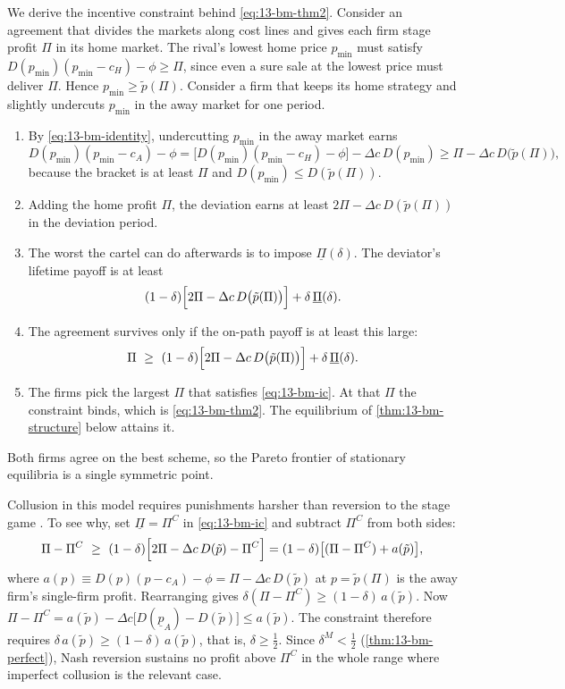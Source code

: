We derive the incentive constraint behind \eqref{eq:13-bm-thm2}. Consider an agreement that divides the
markets along cost lines and gives each firm stage profit $\Pi$ in its home market. The rival's lowest home
price $p_{\min}$ must satisfy $D(p_{\min})(p_{\min}-c_H)-\phi\ge\Pi$, since even a sure sale at the lowest price
must deliver $\Pi$. Hence $p_{\min}\ge\tilde p(\Pi)$. Consider a firm that keeps its home strategy and
slightly undercuts $p_{\min}$ in the away market for one period.
\begin{enumerate}[label=Step \arabic*.,leftmargin=*]
\item By \eqref{eq:13-bm-identity}, undercutting $p_{\min}$ in the away market earns
\[
D(p_{\min})(p_{\min}-c_A)-\phi=\bigl[D(p_{\min})(p_{\min}-c_H)-\phi\bigr]-\Delta c\,D(p_{\min})
\ge\Pi-\Delta c\,D\bigl(\tilde p(\Pi)\bigr),
\]
because the bracket is at least $\Pi$ and $D(p_{\min})\le D(\tilde p(\Pi))$.
\item Adding the home profit $\Pi$, the deviation earns at least $2\Pi-\Delta c\,D(\tilde p(\Pi))$ in the
deviation period.
\item The worst the cartel can do afterwards is to impose $\underline\Pi(\delta)$. The deviator's lifetime payoff
is at least
\[
(1-\delta)\Bigl[2\Pi-\Delta c\,D\bigl(\tilde p(\Pi)\bigr)\Bigr]+\delta\,\underline\Pi(\delta).
\]
\item The agreement survives only if the on-path payoff is at least this large:
\begin{equation}\label{eq:13-bm-ic}
\Pi\ \ge\ (1-\delta)\Bigl[2\Pi-\Delta c\,D\bigl(\tilde p(\Pi)\bigr)\Bigr]+\delta\,\underline\Pi(\delta).
\end{equation}
\item The firms pick the largest $\Pi$ that satisfies \eqref{eq:13-bm-ic}. At that $\Pi$ the constraint
binds, which is \eqref{eq:13-bm-thm2}. The equilibrium of \cref{thm:13-bm-structure} below attains it.
\end{enumerate}
Both firms agree on the best scheme, so the Pareto frontier of stationary equilibria is a single symmetric
point.

\begin{remark}\label{rem:13-bm-nash}
Collusion in this model requires punishments harsher than reversion to the stage game
\citep[footnote 22]{BernheimMadsen2017}. To see why, set $\underline\Pi=\Pi^C$ in \eqref{eq:13-bm-ic} and
subtract $\Pi^C$ from both sides:
\[
\Pi-\Pi^C\ \ge\ (1-\delta)\Bigl[2\Pi-\Delta c\,D(\tilde p)-\Pi^C\Bigr]
=(1-\delta)\bigl[(\Pi-\Pi^C)+a(\tilde p)\bigr],
\]
where $a(p)\equiv D(p)(p-c_A)-\phi=\Pi-\Delta c\,D(\tilde p)$ at $p=\tilde p(\Pi)$ is the away firm's
single-firm profit. Rearranging gives $\delta(\Pi-\Pi^C)\ge(1-\delta)\,a(\tilde p)$. Now
$\Pi-\Pi^C=a(\tilde p)-\Delta c\bigl[D(\underline p_A)-D(\tilde p)\bigr]\le a(\tilde p)$. The constraint
therefore requires $\delta\,a(\tilde p)\ge(1-\delta)\,a(\tilde p)$, that is, $\delta\ge\frac{1}{2}$. Since
$\delta^M<\frac{1}{2}$ (\cref{thm:13-bm-perfect}), Nash reversion sustains no profit above $\Pi^C$ in the whole
range where imperfect collusion is the relevant case.
\end{remark}

